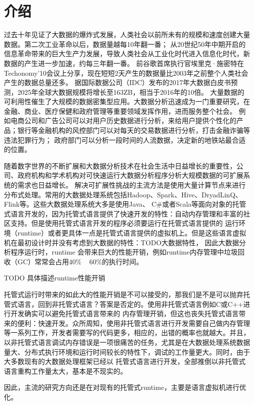 
\chapter{介绍}
过去十年见证了大数据的爆炸式发展，人类社会以前所未有的规模和速度创建大量数据。第二次工业革命以后，数据量越每10年翻一番；
从20世纪50年中期开启的信息革命带来的巨大生产力发展，导致人类社会从工业化时代进入信息化时代，新数据的产生进一步加速，约每三年翻一番。
前谷歌首席执行官埃里克·施密特在Techonomy'10会议上分享，现在短短2天产生的数据量比2003年之前整个人类社会产生的数据总量还多。
据国际数据公司（IDC）发布的2017年大数据白皮书预测，2025年全球大数据规模将增长至163ZB，相当于2016年的10倍。
大量数据的可利用性催生了大规模的数据密集型应用。大数据分析迅速成为一门重要研究，在金融、商业、医疗保健和政府管理等重要领域发挥作用，进而服务整个社会。
例如电商公司和广告公司可以对用户历史数据进行分析，来给用户提供个性化的产品；银行等金融机构的风控部门可以对每天的交易数据进行分析，打击金融诈骗等违法犯罪行为；
政府部门可以分析一段时间的人流数据，决定新的地铁站最合适的位置。

随着数字世界的不断扩展和大数据分析技术在社会生活中日益增长的重要性，公司、政府机构和学术机构对可快速运行大数据分析程序分析大规模数据的可扩展系统的需求也日益增长。
解决可扩展性挑战的主流方法是使用大量计算节点来进行分布式处理。常用的大数据处理系统包括Hadoop、Spark、Hive、DryadLinQ、Flink等。这些大数据处理系统大多是使用Java、
C\#或者Scala等面向对象的托管式语言开发的，因为托管式语言提供了快速开发的特性：自动内存管理和丰富的社区支持。但是使用托管式语言开发的程序必须要运行在托管式语言提供的
运行环境（runtime）或者更具体一点是托管式语言提供的虚拟机上。但是这些语言虚拟机在最初设计时并没有考虑到大数据的特性：TODO大数据特性， 因此大数据分析程序运行时，runtime
会带来巨大的性能开销，例如runtime内存管理中垃圾回收（GC）常常会占用40\% ~ 60\%的执行时间。

TODO 具体描述runtime性能开销

托管式运行时带来的如此大的性能开销是不可以接受的，那我们是不是可以抛弃托管式语言，回到非托管式语言？答案是否定的。使用非托管式语言例如C或C++进行开发确实可以避免托管式语言带来的
内存管理开销，但这也丧失托管式语言带来的便利：快速开发。众所周知，使用非托管式语言进行开发需要自己做内存管理等一系列工作，开发者需要写的代码更多，相应的，出错的概率也就越大。并且，
以非托管式语言调试内存错误是一项很痛苦的任务，尤其是在大数据处理系统数据量大、分布式执行环境和运行时间较长的特性下，调试的工作量更大。同时，由于大多数现有的大数据处理框架已经以
托管式语言进行开发，全部推倒以非托管式语言重构工作量太大，基本是不现实的。

因此，主流的研究方向还是在对现有的托管式runtime，主要是语言虚拟机进行优化。







